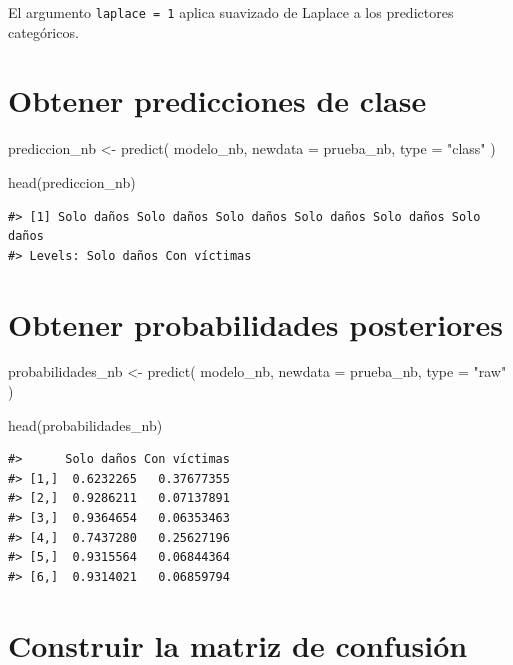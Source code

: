 \documentclass[
  spanish,
  10.5pt,
  letterpaper,
  openany,
  headings=big]{scrbook}
\newenvironment{Shaded}{}{}
\newcommand{\AttributeTok}[1]{\textcolor[rgb]{0.84,0.23,0.29}{#1}}
\newcommand{\FunctionTok}[1]{\textcolor[rgb]{0.44,0.26,0.76}{#1}}
\newcommand{\NormalTok}[1]{\textcolor[rgb]{0.14,0.16,0.18}{#1}}
\newcommand{\OtherTok}[1]{\textcolor[rgb]{0.44,0.26,0.76}{#1}}
\newcommand{\StringTok}[1]{\textcolor[rgb]{0.01,0.18,0.38}{#1}}
\begin{document}
El argumento \texttt{laplace\ =\ 1} aplica suavizado de Laplace a los
predictores categóricos.

\section{Obtener predicciones de
clase}\label{obtener-predicciones-de-clase}

\begin{Shaded}
\begin{Highlighting}[]
\NormalTok{prediccion\_nb }\OtherTok{\textless{}{-}} \FunctionTok{predict}\NormalTok{(}
\NormalTok{  modelo\_nb,}
  \AttributeTok{newdata =}\NormalTok{ prueba\_nb,}
  \AttributeTok{type =} \StringTok{"class"}
\NormalTok{)}

\FunctionTok{head}\NormalTok{(prediccion\_nb)}
\end{Highlighting}
\end{Shaded}

\begin{verbatim}
#> [1] Solo daños Solo daños Solo daños Solo daños Solo daños Solo daños
#> Levels: Solo daños Con víctimas
\end{verbatim}

\section{Obtener probabilidades
posteriores}\label{obtener-probabilidades-posteriores}

\begin{Shaded}
\begin{Highlighting}[]
\NormalTok{probabilidades\_nb }\OtherTok{\textless{}{-}} \FunctionTok{predict}\NormalTok{(}
\NormalTok{  modelo\_nb,}
  \AttributeTok{newdata =}\NormalTok{ prueba\_nb,}
  \AttributeTok{type =} \StringTok{"raw"}
\NormalTok{)}

\FunctionTok{head}\NormalTok{(probabilidades\_nb)}
\end{Highlighting}
\end{Shaded}

\begin{verbatim}
#>      Solo daños Con víctimas
#> [1,]  0.6232265   0.37677355
#> [2,]  0.9286211   0.07137891
#> [3,]  0.9364654   0.06353463
#> [4,]  0.7437280   0.25627196
#> [5,]  0.9315564   0.06844364
#> [6,]  0.9314021   0.06859794
\end{verbatim}

\section{Construir la matriz de
confusión}\label{construir-la-matriz-de-confusiuxf3n}
\end{document}
